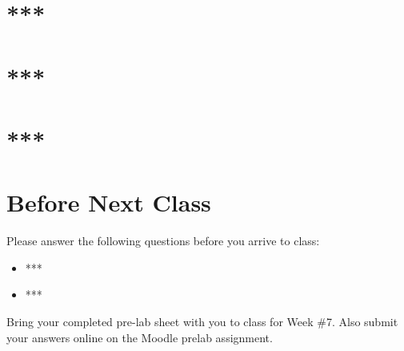 \section{***}
\section{***}
\section{***}

\section{Before Next Class}

Please answer the following questions before you arrive to class:

\begin{exer}

\begin{itemize}

\item ***

  \evalline
  
\item ***

  \evalline
  
\end{itemize}

\end{exer}

Bring your completed pre-lab sheet with you to class for Week \#7. Also submit your answers online on the Moodle prelab assignment.  

